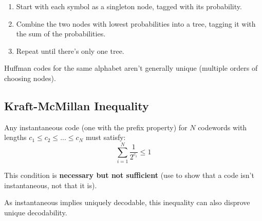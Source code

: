 \documentclass[a4paper, 11pt]{article}
\begin{document}
{{        \begin{enumerate}
        \item Start with each symbol as a singleton node, tagged with its probability.
        \item Combine the two nodes with lowest probabilities into a tree, tagging it with the sum of the probabilities.
        \item Repeat until there's only one tree.
        \end{enumerate}

        Huffman codes for the same alphabet aren't generally unique (multiple orders of choosing nodes).
    }
    \subsection*{Kraft-McMillan Inequality}
    {
        Any instantaneous code (one with the prefix property) for \(N\) codewords with lengths \(c_1 \leq c_2 \leq ... \leq c_N\) must satisfy:
        \[\sum_{i=1}^N{\frac{1}{2^{c_i}}} \leq 1\]

        This condition is \textbf{necessary but not sufficient} (use to show that a code isn't instantaneous, not that it is).

        As instantaneous implies uniquely decodable, this inequality can also disprove unique decodability.
    }
}
\end{document}
